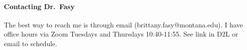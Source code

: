 \paragraph{Contacting Dr.~Fasy}
The best way to reach me is through email (brittany.fasy@montana.edu).  I have
office hours via Zoom Tuesdays and Thursdays 10:40-11:55.  See link in D2L or
email to schedule.
